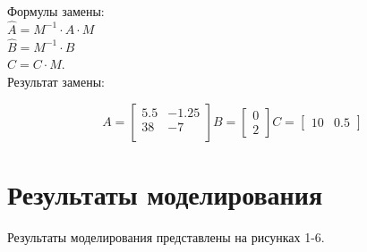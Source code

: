 \documentclass[12pt, a4paper] {ncc}
\begin{document}
		Формулы замены:\\
		$\hat{A} = M^{-1} \cdot A \cdot M$ \\ $\hat{B} = M^{-1} \cdot B$ \\ $ \hat{C} = C \cdot M$. \\

		Результат замены:
		\begin{center}
    		\[A = 
    			\begin{bmatrix}
    				5.5  & -1.25 \\
    				38   & -7  \\
    			\end{bmatrix}
    		  B = 
				\begin{bmatrix}
					0 \\ 2 
				\end{bmatrix}
    		  C = 
				\begin{bmatrix}
					10 & 0.5
				\end{bmatrix}
			\]
		\end{center}
		

\section{Результаты моделирования}

	Результаты моделирования представлены на рисунках 1-6.
\end{document}
